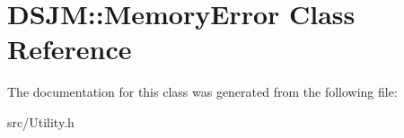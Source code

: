 \hypertarget{classDSJM_1_1MemoryError}{
\section{DSJM::MemoryError Class Reference}
\label{classDSJM_1_1MemoryError}
}


The documentation for this class was generated from the following file:\begin{DoxyCompactItemize}
\item 
src/Utility.h\end{DoxyCompactItemize}
